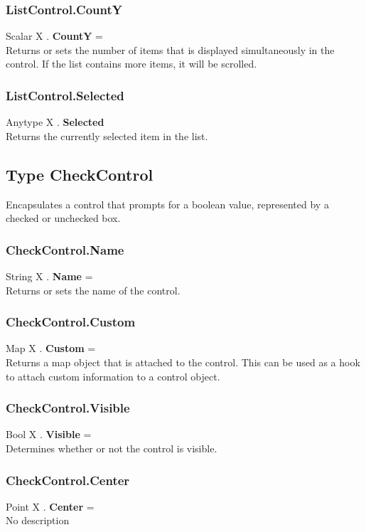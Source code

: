 \documentclass[10pt]{book}
\begin{document}
\subsubsection{ListControl.CountY \label{F:ListControl:CountY}}
Scalar X . \textbf{CountY} = \\
Returns or sets the number of items that is displayed simultaneously in the control. If the list contains more items, it will be scrolled.

\subsubsection{ListControl.Selected \label{F:ListControl:Selected}}
Anytype X . \textbf{Selected} \\
Returns the currently selected item in the list.

\subsection{Type CheckControl \label{T:CheckControl}}
Encapsulates a control that prompts for a boolean value, represented by a checked or unchecked box.

\subsubsection{CheckControl.Name \label{F:CheckControl:Name}}
String X . \textbf{Name} = \\
Returns or sets the name of the control.

\subsubsection{CheckControl.Custom \label{F:CheckControl:Custom}}
Map X . \textbf{Custom} = \\
Returns a map object that is attached to the control. This can be used as a hook to attach custom information to a control object.

\subsubsection{CheckControl.Visible \label{F:CheckControl:Visible}}
Bool X . \textbf{Visible} = \\
Determines whether or not the control is visible.

\subsubsection{CheckControl.Center \label{F:CheckControl:Center}}
Point X . \textbf{Center} = \\
No description
\end{document}
